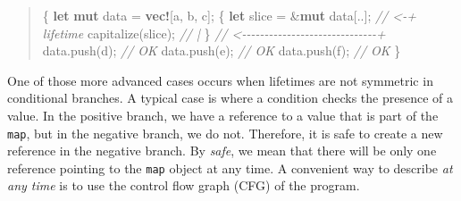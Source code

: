 \documentclass[
  11pt,
  twoside]{report}
\newenvironment{Shaded}{}{}
\newcommand{\CharTok}[1]{#1}
\newcommand{\CommentTok}[1]{\textit{#1}}
\newcommand{\KeywordTok}[1]{\textbf{#1}}
\newcommand{\NormalTok}[1]{#1}
\newcommand{\OperatorTok}[1]{#1}
\newcommand{\PreprocessorTok}[1]{\textbf{#1}}
\begin{document}
\begin{quote}
\begin{Shaded}
\begin{Highlighting}[]
\OperatorTok{\{}
    \KeywordTok{let} \KeywordTok{mut}\NormalTok{ data }\OperatorTok{=} \PreprocessorTok{vec!}\NormalTok{[}\CharTok{\textquotesingle{}a\textquotesingle{}}\OperatorTok{,} \CharTok{\textquotesingle{}b\textquotesingle{}}\OperatorTok{,} \CharTok{\textquotesingle{}c\textquotesingle{}}\NormalTok{]}\OperatorTok{;}
    \OperatorTok{\{}
        \KeywordTok{let}\NormalTok{ slice }\OperatorTok{=} \OperatorTok{\&}\KeywordTok{mut}\NormalTok{ data[}\OperatorTok{..}\NormalTok{]}\OperatorTok{;} \CommentTok{// \textless{}{-}+ \textquotesingle{}lifetime}
\NormalTok{        capitalize(slice)}\OperatorTok{;}         \CommentTok{//   |}
    \OperatorTok{\}} \CommentTok{// \textless{}{-}{-}{-}{-}{-}{-}{-}{-}{-}{-}{-}{-}{-}{-}{-}{-}{-}{-}{-}{-}{-}{-}{-}{-}{-}{-}{-}{-}{-}{-}+}
\NormalTok{    data}\OperatorTok{.}\NormalTok{push(}\CharTok{\textquotesingle{}d\textquotesingle{}}\NormalTok{)}\OperatorTok{;} \CommentTok{// OK}
\NormalTok{    data}\OperatorTok{.}\NormalTok{push(}\CharTok{\textquotesingle{}e\textquotesingle{}}\NormalTok{)}\OperatorTok{;} \CommentTok{// OK}
\NormalTok{    data}\OperatorTok{.}\NormalTok{push(}\CharTok{\textquotesingle{}f\textquotesingle{}}\NormalTok{)}\OperatorTok{;} \CommentTok{// OK}
\OperatorTok{\}}
\end{Highlighting}
\end{Shaded}
\end{quote}

One of those more advanced cases occurs when lifetimes are not symmetric
in conditional branches. A typical case is where a condition checks the
presence of a value. In the positive branch, we have a reference to a
value that is part of the \texttt{map}, but in the negative branch, we
do not. Therefore, it is safe to create a new reference in the negative
branch. By \emph{safe}, we mean that there will be only one reference
pointing to the \texttt{map} object at any time. A convenient way to
describe \emph{at any time} is to use the control flow graph (CFG) of
the program.
\end{document}
